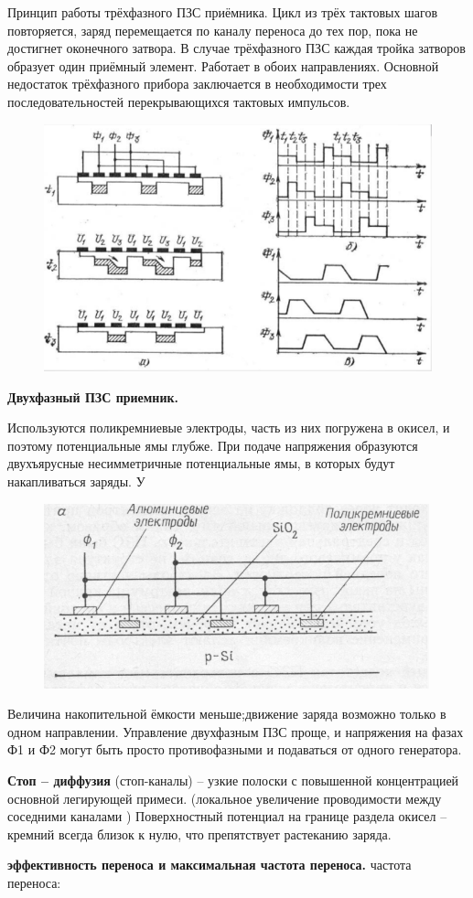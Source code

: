\documentclass[12pt]{article}
\begin{document}
Принцип работы трёхфазного ПЗС приёмника.
Цикл из трёх тактовых шагов повторяется, заряд перемещается по каналу
переноса до тех пор, пока не достигнет оконечного затвора.
В случае трёхфазного ПЗС каждая тройка затворов образует один
приёмный элемент.
Работает в обоих направлениях.
Основной недостаток трёхфазного прибора заключается в необходимости
трех последовательностей перекрывающихся тактовых импульсов.\newpage

\begin{figure}[h]
	\centering
	\includegraphics[width=0.5\linewidth]{"Снимок экрана от 2024-12-23 19-48-04"}
\end{figure}
\textbf{Двухфазный ПЗС приемник.}

Используются поликремниевые электроды,
часть из них погружена в окисел, и поэтому
потенциальные ямы глубже.
При подаче напряжения образуются
двухъярусные несимметричные потенциальные ямы, в которых будут накапливаться
заряды.
У
\begin{figure}[h]
	\centering
	\includegraphics[width=0.4\linewidth]{"Снимок экрана от 2024-12-23 19-48-42"}
\end{figure}
Величина накопительной ёмкости меньше;движение заряда возможно только в одном направлении.
Управление двухфазным ПЗС проще, и напряжения на фазах Ф1 и Ф2
могут быть просто противофазными и подаваться от одного генератора.


\textbf{Стоп -- диффузия} (стоп-каналы) -- узкие полоски с повышенной
концентрацией основной легирующей примеси. (локальное
увеличение проводимости между соседними каналами )
Поверхностный потенциал на границе раздела окисел --
кремний всегда близок к нулю, что препятствует растеканию
заряда.

\textbf{эффективность переноса и максимальная частота
переноса.}
частота переноса:
\end{document}
